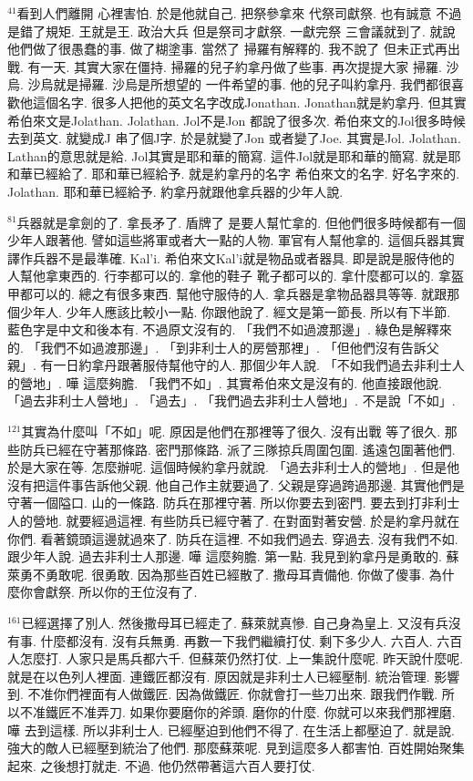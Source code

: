 \documentclass{book}
\begin{document}
$^{41}$看到人們離開 心裡害怕.
於是他就自己.
把祭參拿來 代祭司獻祭.
也有誠意 不過是錯了規矩.
王就是王.
政治大兵 但是祭司才獻祭.
一獻完祭 三會議就到了.
就說他們做了很愚蠢的事.
做了糊塗事.
當然了 掃羅有解釋的.
我不說了 但未正式再出戰.
有一天.
其實大家在僵持.
掃羅的兒子約拿丹做了些事.
再次提提大家 掃羅.
沙烏.
沙烏就是掃羅.
沙烏是所想望的 一件希望的事.
他的兒子叫約拿丹.
我們都很喜歡他這個名字.
很多人把他的英文名字改成Jonathan.
Jonathan就是約拿丹.
但其實希伯來文是Jolathan.
Jolathan.
Jol不是Jon 都說了很多次.
希伯來文的Jol很多時候去到英文.
就變成J 串了個J字.
於是就變了Jon 或者變了Joe.
其實是Jol.
Jolathan.
Lathan的意思就是給.
Jol其實是耶和華的簡寫.
這件Jol就是耶和華的簡寫.
就是耶和華已經給了.
耶和華已經給予.
就是約拿丹的名字 希伯來文的名字.
好名字來的.
Jolathan.
耶和華已經給予.
約拿丹就跟他拿兵器的少年人說.

$^{81}$兵器就是拿劍的了.
拿長矛了.
盾牌了 是要人幫忙拿的.
但他們很多時候都有一個少年人跟著他.
譬如這些將軍或者大一點的人物.
軍官有人幫他拿的.
這個兵器其實譯作兵器不是最準確.
Kal'i.
希伯來文Kal'i就是物品或者器具.
即是說是服侍他的人幫他拿東西的.
行李都可以的.
拿他的鞋子 靴子都可以的.
拿什麼都可以的.
拿盔甲都可以的.
總之有很多東西.
幫他守服侍的人.
拿兵器是拿物品器具等等.
就跟那個少年人.
少年人應該比較小一點.
你跟他說了.
經文是第一節長.
所以有下半節.
藍色字是中文和後本有.
不過原文沒有的.
「我們不如過渡那邊」.
綠色是解釋來的.
「我們不如過渡那邊」.
「到非利士人的房營那裡」.
「但他們沒有告訴父親」.
有一日約拿丹跟著服侍幫他守的人.
那個少年人說.
「不如我們過去非利士人的營地」.
嘩 這麼夠膽.
「我們不如」.
其實希伯來文是沒有的.
他直接跟他說.
「過去非利士人營地」.
「過去」.
「我們過去非利士人營地」.
不是說「不如」.

$^{121}$其實為什麼叫「不如」呢.
原因是他們在那裡等了很久.
沒有出戰 等了很久.
那些防兵已經在守著那條路.
密門那條路.
派了三隊掠兵周圍包圍.
遙遠包圍著他們.
於是大家在等.
怎麼辦呢.
這個時候約拿丹就說.
「過去非利士人的營地」.
但是他沒有把這件事告訴他父親.
他自己作主就要過了.
父親是穿過跨過那邊.
其實他們是守著一個隘口.
山的一條路.
防兵在那裡守著.
所以你要去到密門.
要去到打非利士人的營地.
就要經過這裡.
有些防兵已經守著了.
在對面對著安營.
於是約拿丹就在你們.
看著鏡頭這邊就過來了.
防兵在這裡.
不如我們過去.
穿過去.
沒有我們不如.
跟少年人說.
過去非利士人那邊.
嘩 這麼夠膽.
第一點.
我見到約拿丹是勇敢的.
蘇萊勇不勇敢呢.
很勇敢.
因為那些百姓已經散了.
撒母耳責備他.
你做了傻事.
為什麼你會獻祭.
所以你的王位沒有了.

$^{161}$已經選擇了別人.
然後撒母耳已經走了.
蘇萊就真慘.
自己身為皇上.
又沒有兵沒有事.
什麼都沒有.
沒有兵無勇.
再數一下我們繼續打仗.
剩下多少人.
六百人.
六百人怎麼打.
人家只是馬兵都六千.
但蘇萊仍然打仗.
上一集說什麼呢.
昨天說什麼呢.
就是在以色列人裡面.
連鐵匠都沒有.
原因就是非利士人已經壓制.
統治管理.
影響到.
不准你們裡面有人做鐵匠.
因為做鐵匠.
你就會打一些刀出來.
跟我們作戰.
所以不准鐵匠不准弄刀.
如果你要磨你的斧頭.
磨你的什麼.
你就可以來我們那裡磨.
嘩 去到這樣.
所以非利士人.
已經壓迫到他們不得了.
在生活上都壓迫了.
就是說.
強大的敵人已經壓到統治了他們.
那麼蘇萊呢.
見到這麼多人都害怕.
百姓開始聚集起來.
之後想打就走.
不過.
他仍然帶著這六百人要打仗.
\end{document}
